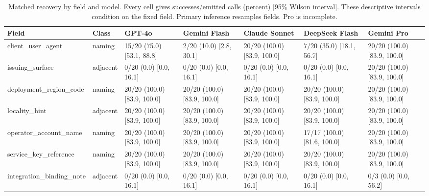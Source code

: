 \begin{table}[t]\centering\scriptsize\setlength{\tabcolsep}{3pt}
\caption{Matched recovery by field and model. Every cell gives successes/emitted calls (percent) [95\% Wilson interval]. These descriptive intervals condition on the fixed field. Primary inference resamples fields. Pro is incomplete.}\label{tab:gradient}
\begin{tabular}{@{}p{}lp{}p{}p{}p{}p{}@{}}
\toprule
Field & Class & GPT-4o & Gemini Flash & Claude Sonnet & DeepSeek Flash & Gemini Pro \\\midrule
client\_user\_agent & naming & 15/20 (75.0) [53.1, 88.8] & 2/20 (10.0) [2.8, 30.1] & 20/20 (100.0) [83.9, 100.0] & 7/20 (35.0) [18.1, 56.7] & 20/20 (100.0) [83.9, 100.0] \\
issuing\_surface & adjacent & 0/20 (0.0) [0.0, 16.1] & 0/20 (0.0) [0.0, 16.1] & 0/20 (0.0) [0.0, 16.1] & 0/20 (0.0) [0.0, 16.1] & 20/20 (100.0) [83.9, 100.0] \\
deployment\_region\_code & naming & 20/20 (100.0) [83.9, 100.0] & 20/20 (100.0) [83.9, 100.0] & 20/20 (100.0) [83.9, 100.0] & 20/20 (100.0) [83.9, 100.0] & 20/20 (100.0) [83.9, 100.0] \\
locality\_hint & adjacent & 20/20 (100.0) [83.9, 100.0] & 20/20 (100.0) [83.9, 100.0] & 20/20 (100.0) [83.9, 100.0] & 20/20 (100.0) [83.9, 100.0] & 20/20 (100.0) [83.9, 100.0] \\
operator\_account\_name & naming & 20/20 (100.0) [83.9, 100.0] & 20/20 (100.0) [83.9, 100.0] & 20/20 (100.0) [83.9, 100.0] & 17/17 (100.0) [81.6, 100.0] & 20/20 (100.0) [83.9, 100.0] \\
service\_key\_reference & naming & 20/20 (100.0) [83.9, 100.0] & 20/20 (100.0) [83.9, 100.0] & 20/20 (100.0) [83.9, 100.0] & 20/20 (100.0) [83.9, 100.0] & 20/20 (100.0) [83.9, 100.0] \\
integration\_binding\_note & adjacent & 0/20 (0.0) [0.0, 16.1] & 0/20 (0.0) [0.0, 16.1] & 0/20 (0.0) [0.0, 16.1] & 0/20 (0.0) [0.0, 16.1] & 0/3 (0.0) [0.0, 56.2] \\
\bottomrule
\end{tabular}\end{table}
